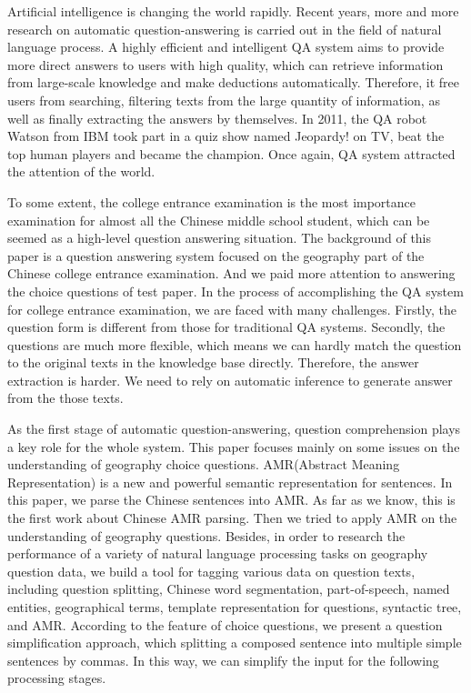 \documentclass[master, winfont]{njuthesis}
\begin{document}
\begin{englishabstract}
Artificial intelligence is changing the world rapidly. Recent years, more and more research on automatic question-answering is carried out in the field of natural language process. A highly efficient and intelligent QA system aims to provide more direct answers to users with high quality, which can retrieve information from large-scale knowledge and make deductions automatically. Therefore, it free users from searching, filtering texts from the large quantity of information, as well as finally extracting the answers by themselves. In 2011, the QA robot Watson from IBM took part in a quiz show named Jeopardy! on TV, beat the top human players and became the champion. Once again, QA system attracted the attention of the world.

To some extent, the college entrance examination is the most importance examination for almost all the Chinese middle school student, which can be seemed as a high-level question answering situation. The background of this paper is a question answering system focused on the geography part of the Chinese college entrance examination. And we paid more attention to answering the choice questions of test paper.  In the process of accomplishing the QA system for college entrance examination, we are faced with many challenges. Firstly, the question form is different from those for traditional QA systems. Secondly, the questions are much more flexible, which means we can hardly match the question to the original texts in the knowledge base directly. Therefore, the answer extraction is harder. We need to rely on automatic inference to generate answer from the those texts.

As the first stage of automatic question-answering, question comprehension plays a key role for the whole system. This paper focuses mainly on some issues on the understanding of geography choice questions. AMR(Abstract Meaning Representation) is a new and powerful semantic representation for sentences. In this paper, we parse the Chinese sentences into AMR. As far as we know, this is the first work about Chinese AMR parsing. Then we tried to apply AMR on the understanding of geography questions. Besides, in order to research the performance of a variety of natural language processing tasks on geography question data, we build a tool for tagging various data on question texts, including question splitting, Chinese word segmentation, part-of-speech, named entities, geographical terms, template representation for questions, syntactic tree, and AMR. According to the feature of choice questions, we present a question simplification approach, which splitting a composed sentence into multiple simple sentences by commas. In this way, we can simplify the input for the following processing stages.


\end{englishabstract}
\end{document}
